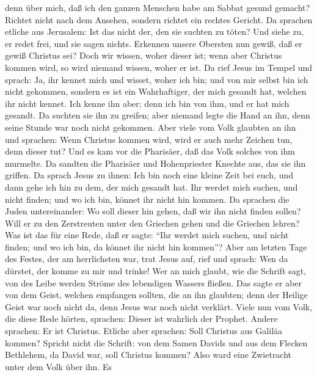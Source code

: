 denn über mich, daß ich den ganzen Menschen habe am Sabbat gesund
gemacht?  Richtet nicht nach dem Ansehen, sondern richtet
ein rechtes Gericht.  Da sprachen etliche aus Jerusalem:
Ist das nicht der, den sie suchten zu töten?  Und siehe zu,
er redet frei, und sie sagen nichts. Erkennen unsere Obersten nun gewiß,
daß er gewiß Christus sei?  Doch wir wissen, woher dieser
ist; wenn aber Christus kommen wird, so wird niemand wissen, woher er
ist.  Da rief Jesus im Tempel und sprach: Ja, ihr kennet
mich und wisset, woher ich bin; und von mir selbst bin ich nicht
gekommen, sondern es ist ein Wahrhaftiger, der mich gesandt hat, welchen
ihr nicht kennet.  Ich kenne ihn aber; denn ich bin von
ihm, und er hat mich gesandt.  Da suchten sie ihn zu
greifen; aber niemand legte die Hand an ihn, denn seine Stunde war noch
nicht gekommen.  Aber viele vom Volk glaubten an ihn und
sprachen: Wenn Christus kommen wird, wird er auch mehr Zeichen tun, denn
dieser tut?  Und es kam vor die Pharisäer, daß das Volk
solches von ihm murmelte. Da sandten die Pharisäer und Hohenpriester
Knechte aus, das sie ihn griffen.  Da sprach Jesus zu
ihnen: Ich bin noch eine kleine Zeit bei euch, und dann gehe ich hin zu
dem, der mich gesandt hat.  Ihr werdet mich suchen, und
nicht finden; und wo ich bin, könnet ihr nicht hin kommen. 
Da sprachen die Juden untereinander: Wo soll dieser hin gehen, daß wir
ihn nicht finden sollen? Will er zu den Zerstreuten unter den Griechen
gehen und die Griechen lehren?  Was ist das für eine Rede,
daß er sagte: ``Ihr werdet mich suchen, und nicht finden; und wo ich
bin, da könnet ihr nicht hin kommen''?  Aber am letzten
Tage des Festes, der am herrlichsten war, trat Jesus auf, rief und
sprach: Wen da dürstet, der komme zu mir und trinke!  Wer
an mich glaubt, wie die Schrift sagt, von des Leibe werden Ströme des
lebendigen Wassers fließen.  Das sagte er aber von dem
Geist, welchen empfangen sollten, die an ihn glaubten; denn der Heilige
Geist war noch nicht da, denn Jesus war noch nicht verklärt.
 Viele nun vom Volk, die diese Rede hörten, sprachen:
Dieser ist wahrlich der Prophet.  Andere sprachen: Er ist
Christus. Etliche aber sprachen: Soll Christus aus Galiläa kommen?
 Spricht nicht die Schrift: von dem Samen Davids und aus
dem Flecken Bethlehem, da David war, soll Christus kommen? 
Also ward eine Zwietracht unter dem Volk über ihn.  Es
